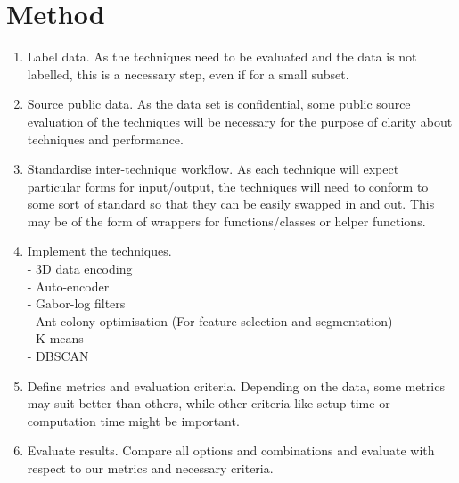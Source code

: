 \documentclass[11pt, a4paper]{article}
\begin{document}
\section*{Method}
\begin{enumerate}
\item Label data. As the techniques need to be evaluated and the data is not labelled, this is a necessary step, even if for a small subset.
\item Source public data. As the data set is confidential, some public source evaluation of the techniques will be necessary for the purpose of clarity about techniques and performance.
\item Standardise inter-technique workflow. As each technique will expect particular forms for input/output, the techniques will need to conform to some sort of standard so that they can be easily swapped in and out. This may be of the form of wrappers for functions/classes or helper functions.
\item Implement the techniques.\\
	- 3D data encoding\\
	- Auto-encoder\\
	- Gabor-log filters\\
	- Ant colony optimisation (For feature selection and segmentation)\\
	- K-means\\
	- DBSCAN
\item Define metrics and evaluation criteria. Depending on the data, some metrics may suit better than others, while other criteria like setup time or computation time might be important.
\item Evaluate results. Compare all options and combinations and evaluate with respect to our metrics and necessary criteria.
\end{enumerate}

\end{document}

